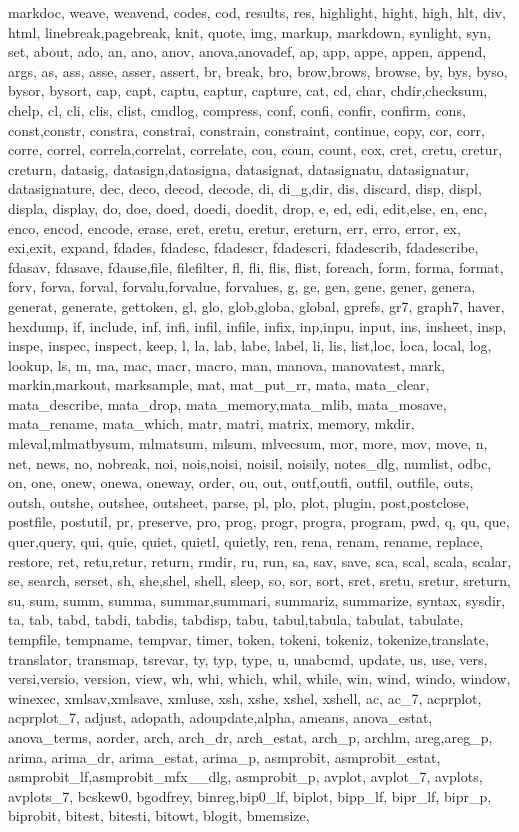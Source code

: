 {{	markdoc, weave, weavend, codes, cod, results, res, highlight, hight, high, hlt, div, html, linebreak,pagebreak, knit, quote, img, markup, markdown, synlight, syn, set, about, ado, an, ano, anov, anova,anovadef, ap, app, appe, appen, append, args, as, ass, asse, asser, assert, br, break, bro, brow,brows, browse, by, bys, byso, bysor, bysort, cap, capt, captu, captur, capture, cat, cd, char, chdir,checksum, chelp, cl, cli, clis, clist, cmdlog, compress, conf, confi, confir, confirm, cons, const,constr, constra, constrai, constrain, constraint, continue, copy, cor, corr, corre, correl, correla,correlat, correlate, cou, coun, count, cox, cret, cretu, cretur, creturn, datasig, datasign,datasigna, datasignat, datasignatu, datasignatur, datasignature, dec, deco, decod, decode, di, di_g,dir, dis, discard, disp, displ, displa, display, do, doe, doed, doedi, doedit, drop, e, ed, edi, edit,else, en, enc, enco, encod, encode, erase, eret, eretu, eretur, ereturn, err, erro, error, ex, exi,exit, expand, fdades, fdadesc, fdadescr, fdadescri, fdadescrib, fdadescribe, fdasav, fdasave, fdause,file, filefilter, fl, fli, flis, flist, foreach, form, forma, format, forv, forva, forval, forvalu,forvalue, forvalues, g, ge, gen, gene, gener, genera, generat, generate, gettoken, gl, glo, glob,globa, global, gprefs, gr7, graph7, haver, hexdump, if, include, inf, infi, infil, infile, infix, inp,inpu, input, ins, insheet, insp, inspe, inspec, inspect, keep, l, la, lab, labe, label, li, lis, list,loc, loca, local, log, lookup, ls, m, ma, mac, macr, macro, man, manova, manovatest, mark, markin,markout, marksample, mat, mat_put_rr, mata, mata_clear, mata_describe, mata_drop, mata_memory,mata_mlib, mata_mosave, mata_rename, mata_which, matr, matri, matrix, memory, mkdir, mleval,mlmatbysum, mlmatsum, mlsum, mlvecsum, mor, more, mov, move, n, net, news, no, nobreak, noi, nois,noisi, noisil, noisily, notes_dlg, numlist, odbc, on, one, onew, onewa, oneway, order, ou, out, outf,outfi, outfil, outfile, outs, outsh, outshe, outshee, outsheet, parse, pl, plo, plot, plugin, post,postclose, postfile, postutil, pr, preserve, pro, prog, progr, progra, program, pwd, q, qu, que, quer,query, qui, quie, quiet, quietl, quietly, ren, rena, renam, rename, replace, restore, ret, retu,retur, return, rmdir, ru, run, sa, sav, save, sca, scal, scala, scalar, se, search, serset, sh, she,shel, shell, sleep, so, sor, sort, sret, sretu, sretur, sreturn, su, sum, summ, summa, summar,summari, summariz, summarize, syntax, sysdir, ta, tab, tabd, tabdi, tabdis, tabdisp, tabu, tabul,tabula, tabulat, tabulate, tempfile, tempname, tempvar, timer, token, tokeni, tokeniz, tokenize,translate, translator, transmap, tsrevar, ty, typ, type, u, unabcmd, update, us, use, vers, versi,versio, version, view, wh, whi, which, whil, while, win, wind, windo, window, winexec, xmlsav,xmlsave, xmluse, xsh, xshe, xshel, xshell, ac, ac_7, acprplot, acprplot_7, adjust, adopath, adoupdate,alpha, ameans, anova_estat, anova_terms, aorder, arch, arch_dr, arch_estat, arch_p, archlm, areg,areg_p, arima, arima_dr, arima_estat, arima_p, asmprobit, asmprobit_estat, asmprobit_lf,asmprobit_mfx__dlg, asmprobit_p, avplot, avplot_7, avplots, avplots_7, bcskew0, bgodfrey, binreg,bip0_lf, biplot, bipp_lf, bipr_lf, bipr_p, biprobit, bitest, bitesti, bitowt, blogit, bmemsize, }}
